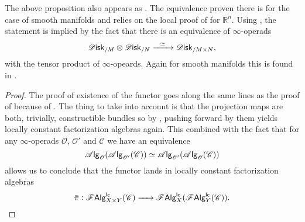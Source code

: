 \documentclass[../text]{subfiles}
\begin{document}
\begin{remark}
    The above proposition also appears as \cite[prop.18]{ginot2015}. The equivalence proven there is for the case of smooth manifolds and relies on the local proof of \cite{lurie_ha} for $\mathbb{R}^n$. Using , the statement is implied by the fact that there is an equivalence of $\infty$-operads
    \begin{equation}
        \disk_{/M} \otimes \disk_{/N} \xrightarrow{\ \ \simeq \ \ } \disk_{/M \times N},
    \end{equation}
    with the tensor product of $\infty$-opeards. Again for smooth manifolds this is found in \cite[ex.5.4.5.5]{lurie_ha}.
\end{remark}

\begin{proof}
    The proof of existence of the functor goes along the same lines as the proof of  because of . The thing to take into account is that the projection maps are both, trivially, constructible bundles so by , pushing forward by them yields locally constant factorization algebras again. This combined with the fact that for any $\infty$-operads $\mathscr{O}$, $\mathscr{O}'$ and $\mathscr{C}$ we have an equivalence
    \begin{equation}
        \mathscr{A} \mathsf{lg}_{\mathscr{O}} (\mathscr{A} \mathsf{lg}_{\mathscr{O}'} (\mathscr{C})) \simeq \mathscr{A} \mathsf{lg}_{\mathscr{O}'} (\mathscr{A} \mathsf{lg}_{\mathscr{O}} (\mathscr{C}))
    \end{equation}
    allows us to conclude that the functor lands in locally constant factorization algebras
    \begin{equation}
        \bar{\pi}: \mathscr{F} \mathsf{Alg}^{\mathsf{lc}}_{X \times Y}(\mathscr{C}) \xrightarrow{\ \ \ \ } \mathscr{F} \mathsf{Alg}^{\mathsf{lc}}_{X}(\mathscr{F} \mathsf{Alg}^{\mathsf{lc}}_{Y}(\mathscr{C})).
    \end{equation}


\end{proof}
\end{document}
